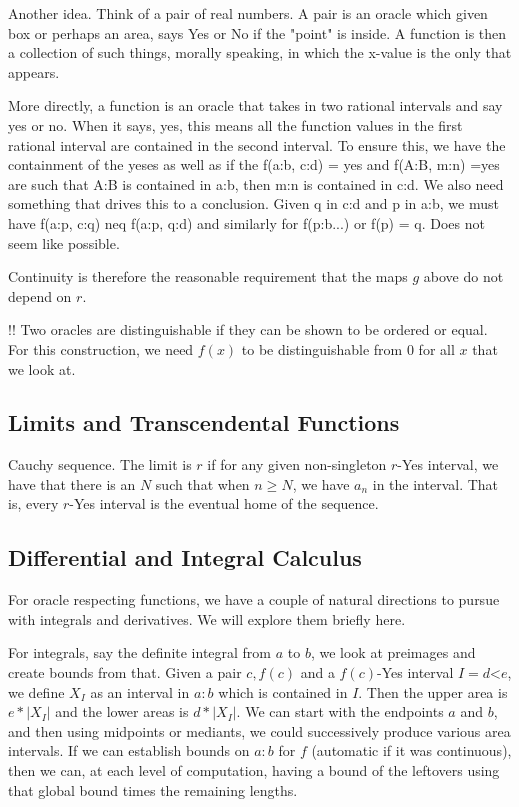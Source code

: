 \documentclass[12pt]{article}
\theoremstyle{remark}
\newcommand{\lt}{\mathord{<}}
\begin{document}
Another idea. Think of a pair of real numbers. A pair is an oracle which given box or perhaps an area, says Yes or No if the "point" is inside. A function is then a collection of such things, morally speaking, in which the x-value is the only that appears. 

More directly, a function is an oracle that takes in two rational intervals  and say yes or no. When it says, yes, this means all the function values in the first rational interval are contained in the second interval. To ensure this, we have the containment of the yeses as well as if the f(a:b, c:d) = yes and f(A:B, m:n) =yes are such that A:B is contained in a:b, then m:n is contained in c:d. We also need something that drives this to a conclusion. Given q in c:d and p in a:b, we must have f(a:p, c:q) neq f(a:p, q:d) and similarly for f(p:b...) or  f(p) = q. Does not seem like possible. 


Continuity is therefore the reasonable requirement that the maps $g$ above do not depend on $r$. 

!! Two oracles are distinguishable if they can be shown to be ordered or equal. For this construction, we need $f(x)$ to be distinguishable from 0 for all $x$ that we look at. 


\subsection{Limits and Transcendental Functions}

Cauchy sequence. The limit is $r$ if for any given non-singleton $r$-Yes interval, we have that there is an $N$ such that  when $n \geq N$, we have $a_n$ in the interval.  That is, every $r$-Yes interval is the eventual home of the sequence. 


\subsection{Differential and Integral Calculus}

For oracle respecting functions, we have a couple of natural directions to pursue with integrals and derivatives. We will explore them briefly here. 

For integrals, say the definite integral from $a$ to $b$, we look at preimages and create bounds from that. Given a pair $c, f(c)$ and a $f(c)$-Yes interval $I=d\lt e$, we define $X_I$ as an interval in $a:b$ which is contained in $I$. Then the upper area is $e*|X_I|$ and the lower areas is $d*|X_I|$. We can start with the endpoints $a$ and $b$, and then using midpoints or mediants, we could successively produce various area intervals. If we can establish bounds on $a:b$ for $f$ (automatic if it was continuous), then we can, at each level of computation, having a bound of the leftovers using that global bound times the remaining lengths.
\end{document}

